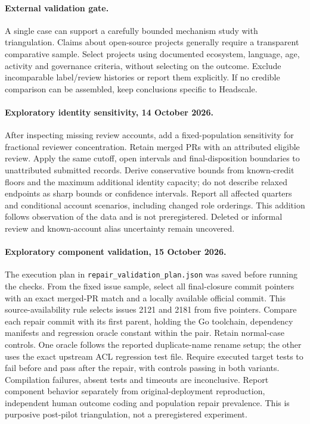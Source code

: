 \documentclass[11pt]{article}
\begin{document}
\paragraph{External validation gate.} A single case can support a carefully bounded
mechanism study with triangulation. Claims about open-source projects generally
require a transparent comparative sample. Select projects using documented ecosystem,
language, age, activity and governance criteria, without selecting on the outcome.
Exclude incomparable label/review histories or report them explicitly. If no
credible comparison can be assembled, keep conclusions specific to Headscale.

\paragraph{Exploratory identity sensitivity, 14 October 2026.}
After inspecting missing review accounts, add a fixed-population sensitivity
for fractional reviewer concentration. Retain merged PRs with an attributed
eligible review. Apply the same cutoff, open intervals and final-disposition
boundaries to unattributed submitted records. Derive conservative bounds from
known-credit floors and the maximum additional identity capacity; do not describe
relaxed endpoints as sharp bounds or confidence intervals. Report all affected
quarters and conditional account scenarios, including changed role orderings.
This addition follows observation of the data and is not preregistered.
Deleted or informal review and known-account alias uncertainty remain uncovered.

\paragraph{Exploratory component validation, 15 October 2026.}
The execution plan in \texttt{repair\_validation\_plan.json} was saved before
running the checks. From the fixed issue sample, select all final-closure commit
pointers with an exact merged-PR match and a locally available official commit.
This source-availability rule selects issues 2121 and 2181 from five pointers.
Compare each repair commit with its first parent, holding the Go toolchain,
dependency manifests and regression oracle constant within the pair. Retain
normal-case controls. One oracle follows the reported duplicate-name rename
setup; the other uses the exact upstream ACL regression test file. Require
executed target tests to fail before and pass after the repair, with controls
passing in both variants. Compilation failures, absent tests and timeouts are
inconclusive. Report component behavior separately from original-deployment
reproduction, independent human outcome coding and population repair prevalence.
This is purposive post-pilot triangulation, not a preregistered experiment.
\end{document}
